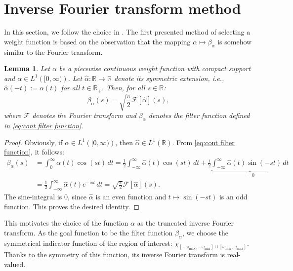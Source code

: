 \documentclass[a4paper,11pt,bibliography=totoc,listof=totoc,headinclude=true,cleardoublepage=empty,oneside]{scrbook}
\newtheorem{lemma}[theorem]{Lemma}
\newcommand{\R}{\mathbb{R}}
\renewcommand{\i}{\mathrm{i}}
\newcommand{\F}{\mathcal{F}}
\begin{document}
\section{Inverse Fourier transform method}
In this section, we follow the choice in \cite{nannen}. The first presented method of selecting a weight function is based on the observation that the mapping $\alpha \mapsto \beta_\alpha$ is somehow similar to the Fourier transform.
\begin{lemma}\label{lemma:alpha fourier}
    Let $\alpha$ be a piecewise continuous weight function with compact support and $\alpha \in L^1\left( [0, \infty) \right)$. Let $\hat{\alpha}: \R \rightarrow \R$ denote its symmetric extension, i.e., $\hat{\alpha}(-t) := \alpha(t)$ for all $t\in \R_+$. Then, for all $s\in \R$:
    \begin{equation*}
        \beta_\alpha (s) = \sqrt{\frac{\pi}{2}} \F\left[\hat{\alpha}\right] (s),
    \end{equation*}
    where $\mathcal{F}$ denotes the Fourier transform and $\beta_\alpha$ denotes the filter function  defined in \eqref{eq:cont filter function}.
\end{lemma}
\begin{proof}
    Obviously, if $\alpha \in L^1\left([0, \infty)\right)$, then $\hat{\alpha} \in L^1\left(\R\right)$. From \eqref{eq:cont filter function}, it follows:
    \begin{align*}
        \beta_\alpha (s) &= \int_0^\infty \alpha(t) \cos(s t) \,dt = \frac{1}{2}\int_{-\infty}^\infty \hat{\alpha}(t) \cos(s t) \,dt + \frac{\i}{2} \underbrace{\int_{-\infty}^\infty \hat{\alpha}(t) \sin(-st) \,dt}_{=0} \\&= \frac{1}{2} \int_{-\infty}^{\infty} \hat{\alpha}(t) e^{-\i st} \, dt = \sqrt{\frac{\pi}{2}} \F\left[\hat{\alpha}\right] (s).
    \end{align*}
    The sine-integral is 0, since $\hat{\alpha}$ is an even function and $t \mapsto \sin(-st)$ is an odd function. This proves the desired identity.
\end{proof}

This motivates the choice of the function $\alpha$ as the truncated inverse Fourier transform. As the goal function to be the filter function $\beta_\alpha$, we choose the symmetrical indicator function of the region of interest: $\chi_{\left[-\omega_{\max}, -\omega_{\min}\right]\cup\left[\omega_{\min}, \omega_{\max}\right]}$. Thanks to the symmetry of this function, its inverse Fourier transform is real-valued.
\end{document}
